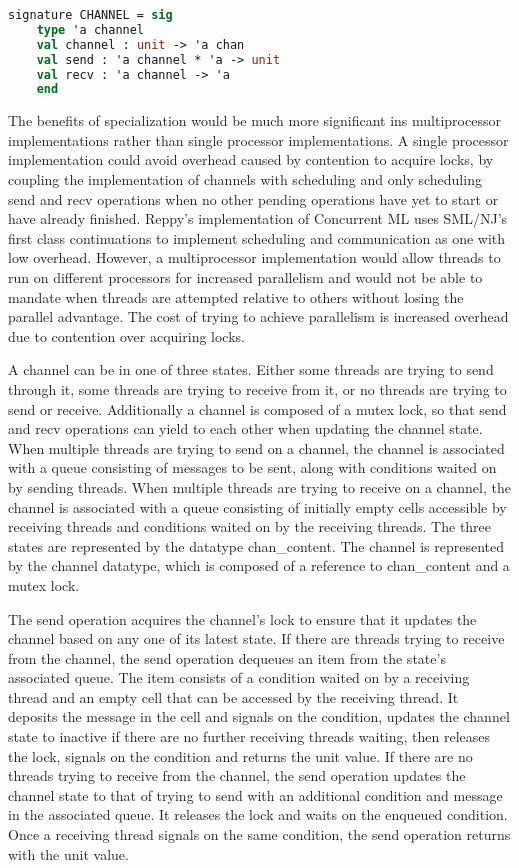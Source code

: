\documentclass{article}
\begin{document}
\begin{lstlisting}[language=ML, escapechar=\%]
  signature CHANNEL = sig
    type 'a channel 
    val channel : unit -> 'a chan
    val send : 'a channel * 'a -> unit
    val recv : 'a channel -> 'a
    end     
\end{lstlisting}


The benefits of specialization would be much more significant ins multiprocessor
implementations rather than single processor implementations.  A single processor
implementation could avoid overhead caused by contention to acquire locks, by coupling the
implementation of channels with scheduling and only scheduling send and recv operations when no
other pending operations have yet to start or have already finished.  Reppy's implementation of
Concurrent ML uses SML/NJ's first class continuations to implement scheduling and communication
as one with low overhead.  However, a multiprocessor implementation would allow threads to run
on different processors for increased parallelism and would not be able to mandate when threads
are attempted relative to others without losing the parallel advantage.  The cost of trying to
achieve parallelism is increased overhead due to contention over acquiring locks.

A channel can be in one of three states.  Either some threads are trying to send through it,
some threads are trying to receive from it, or no threads are trying to send or receive.
Additionally a channel is composed of a mutex lock, so that send and recv operations can yield
to each other when updating the channel state.  When multiple threads are trying to send on a
channel, the channel is associated with a queue consisting of messages to be sent, along with
conditions waited on by sending threads. When multiple threads are trying to receive on a
channel, the channel is associated with a queue consisting of initially empty cells accessible
by receiving threads and conditions waited on by the receiving threads. The three states are
represented by the datatype chan\_content.  The channel is represented by the channel datatype,
which is composed of a reference to chan\_content and a mutex lock.  

The send operation acquires the channel's lock to ensure that it updates the channel based on
any one of its latest state.  If there are threads trying to receive from the channel, the send
operation dequeues an item from the state's associated queue.  The item consists of a condition
waited on by a receiving thread and an empty cell that can be accessed by the receiving thread.
It deposits the message in the cell and signals on the condition, updates the channel state to
inactive if there are no further receiving threads waiting, then releases the lock, signals on
the condition and returns the unit value.  If there are no threads trying to receive from the
channel, the send operation updates the channel state to that of trying to send with an
additional condition and message in the associated queue.  It releases the lock and waits on
the enqueued condition.  Once a receiving thread signals on the same condition, the send
operation returns with the unit value.
\end{document}
